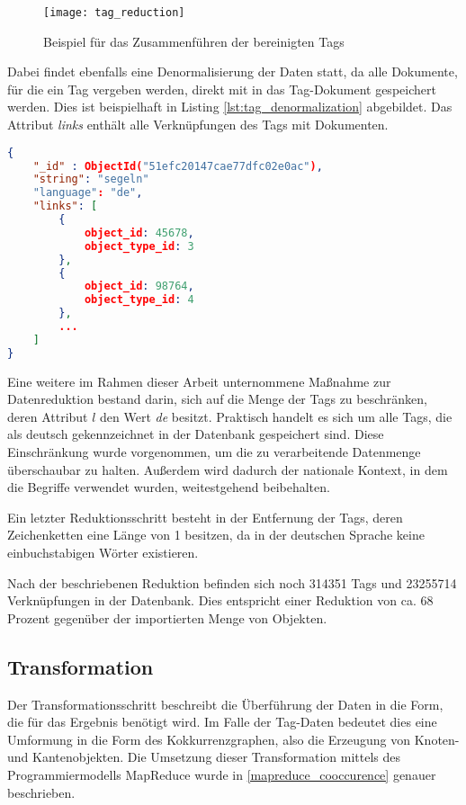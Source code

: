 \begin{figure}
\centering
\texttt{[image: tag\_reduction]}
\caption{Beispiel für das Zusammenführen der bereinigten Tags}
\label{fig:tag_reduction}
\end{figure}

Dabei findet ebenfalls eine Denormalisierung der Daten statt, da alle Dokumente, für die ein Tag vergeben werden, direkt mit in das Tag-Dokument gespeichert werden. Dies ist beispielhaft in Listing \ref{lst:tag_denormalization} abgebildet. Das Attribut \emph{links} enthält alle Verknüpfungen des Tags mit Dokumenten.

\begin{lstlisting}[language=json, label={lst:tag_denormalization}, caption={Denormalisierte Tag-Daten}]
{
    "_id" : ObjectId("51efc20147cae77dfc02e0ac"),
    "string": "segeln"
    "language": "de",
    "links": [
        {
            object_id: 45678, 
            object_type_id: 3
        },
        {
            object_id: 98764, 
            object_type_id: 4
        },
        ...
    ]
}
\end{lstlisting}

Eine weitere im Rahmen dieser Arbeit unternommene Maßnahme zur Datenreduktion bestand darin, sich auf die Menge der Tags zu beschränken, deren Attribut \(l\) den Wert \emph{de} besitzt. Praktisch handelt es sich um alle Tags, die als deutsch gekennzeichnet in der Datenbank gespeichert sind. Diese Einschränkung wurde vorgenommen, um die zu verarbeitende Datenmenge überschaubar zu halten. Außerdem wird dadurch der nationale Kontext, in dem die Begriffe verwendet wurden, weitestgehend beibehalten.

Ein letzter Reduktionsschritt besteht in der Entfernung der Tags, deren Zeichenketten eine Länge von \num{1} besitzen, da in der deutschen Sprache keine einbuchstabigen Wörter existieren.

Nach der beschriebenen Reduktion befinden sich noch \num{314351} Tags und \num{23255714} Verknüpfungen in der Datenbank. Dies entspricht einer Reduktion von ca. \num{68} Prozent gegenüber der importierten Menge von Objekten.

\subsection{Transformation}

Der Transformationsschritt beschreibt die Überführung der Daten in die Form, die für das Ergebnis benötigt wird. Im Falle der Tag-Daten bedeutet dies eine Umformung in die Form des Kokkurrenzgraphen, also die Erzeugung von Knoten- und Kantenobjekten. Die Umsetzung dieser Transformation mittels des Programmiermodells MapReduce wurde in \ref{mapreduce_cooccurence} genauer beschrieben.

